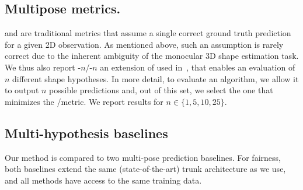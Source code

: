 \subsection{Multipose metrics.}

\MPJPE and \RE are traditional metrics that assume a single correct ground truth prediction for a given 2D observation.
As mentioned above, such an assumption is rarely correct due to the inherent ambiguity of the monocular 3D shape estimation task.
We thus also report \MPJPE-$n$/\RE-$n$ an extension of \MPJPE\RE used in~\cite{li19generating}, that enables an evaluation of $n$ different shape hypotheses.
In more detail, to evaluate an algorithm, we allow it to output $n$ possible predictions and, out of this set, we select the one that minimizes the \MPJPE/\RE metric.
We report results for $n\in \{1,5,10,25\}$.







\subsection{Multi-hypothesis baselines} \label{s:multi_baselines}

Our method is compared to two multi-pose prediction baselines. For fairness, both baselines extend the same (state-of-the-art) trunk architecture as we use, and all methods have access to the same training data. 


